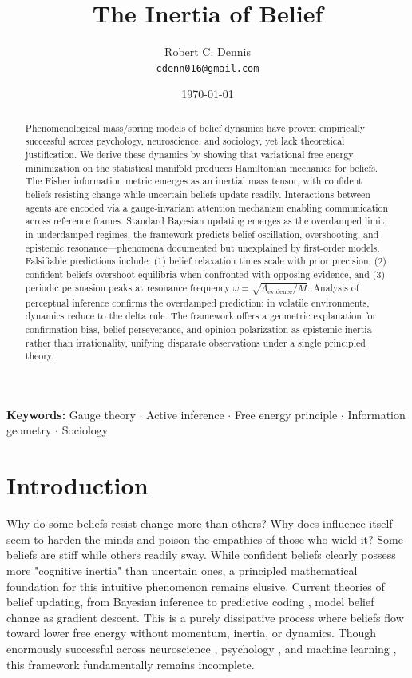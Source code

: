 \documentclass[12pt]{article}
\title{The Inertia of Belief}
\author{
Robert C. Dennis\\
\texttt{cdenn016@gmail.com}
}
\date{\today}
\begin{document}
\maketitle


\begin{abstract}
Phenomenological mass/spring models of belief dynamics have proven empirically successful across psychology, neuroscience, and sociology, yet lack theoretical justification. We derive these dynamics by showing that variational free energy minimization on the statistical manifold produces Hamiltonian mechanics for beliefs. The Fisher information metric emerges as an inertial mass tensor, with confident beliefs resisting change while uncertain beliefs update readily. Interactions between agents are encoded via a gauge-invariant attention mechanism enabling communication across reference frames. Standard Bayesian updating emerges as the overdamped limit; in underdamped regimes, the framework predicts belief oscillation, overshooting, and epistemic resonance---phenomena documented but unexplained by first-order models. Falsifiable predictions include: (1) belief relaxation times scale with prior precision, (2) confident beliefs overshoot equilibria when confronted with opposing evidence, and (3) periodic persuasion peaks at resonance frequency $\omega = \sqrt{\Lambda_{\text{evidence}} / M}$. Analysis of perceptual inference confirms the overdamped prediction: in volatile environments, dynamics reduce to the delta rule. The framework offers a geometric explanation for confirmation bias, belief perseverance, and opinion polarization as epistemic inertia rather than irrationality, unifying disparate observations under a single principled theory.
\end{abstract}


\noindent\textbf{Keywords:} Gauge theory $\cdot$ Active inference $\cdot$ Free energy principle $\cdot$ Information geometry $\cdot$ Sociology

\section{Introduction}

Why do some beliefs resist change more than others? Why does influence itself seem to harden the minds and poison the empathies of those who wield it? Some beliefs are stiff while others readily sway. While confident beliefs clearly possess more "cognitive inertia" than uncertain ones, a principled mathematical foundation for this intuitive phenomenon remains elusive. Current theories of belief updating, from Bayesian inference \citet{jaynes2003probability} to predictive coding \citet{friston2010,clark2013whatever}, model belief change as gradient descent. This is a purely dissipative process where beliefs flow toward lower free energy without momentum, inertia, or dynamics. Though enormously successful across neuroscience \citet{friston2016active}, psychology \citet{hohwy2013predictive}, and machine learning \citet{millidge2021predictive}, this framework fundamentally remains incomplete.
\end{document}
